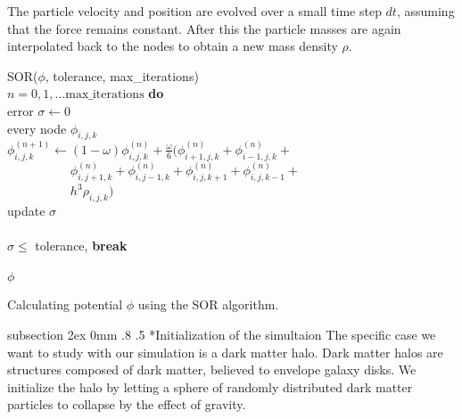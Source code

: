 \documentclass[notitlepage, 12pt]{article}
\makeatletter
\renewcommand{\subsection}{\@startsection    %
        {subsection}
        {2ex}
        {0mm}
        {.8\baselineskip}
        {.5\baselineskip}
        {\bfseries\normalsize}}
\makeatother
\begin{document}
The particle velocity and position are evolved over a small time step $dt$, assuming that the force remains constant. After this the particle masses are again interpolated back to the nodes to obtain a new mass density $\rho$.

\begin{algorithm}[H]
\hspace{0.1\textwidth}\parbox{.8\textwidth}{
\-\hspace{0ex}{\bf function} SOR($\phi$, tolerance, max\_iterations)\\
\-\hspace{4ex}{\bf for} $n = 0,1,\ldots\mbox{max\_iterations}$ {\bf do}\\
\-\hspace{8ex}error $\sigma\leftarrow 0$\\
\-\hspace{8ex}{\bf for} every node $\phi_{i,j,k}$\\
\-\hspace{12ex}$\phi_{i,j,k}^{(n+1)} \leftarrow (1-\omega)\phi_{i,j,k}^{(n)} + \frac{\omega}{6} (\phi_{i+1,j,k}^{(n)} +\phi_{i-1,j,k}^{(n)}+$\\
\-\hspace{12ex}$\phantom{\phi_{i,j,k}^{(n+1)} \leftarrow }\phi_{i,j+1,k}^{(n)}+ \phi_{i,j-1,k}^{(n)} + \phi_{i,j,k+1}^{(n)} + \phi_{i,j,k-1}^{(n)} +$\\
\-\hspace{12ex}$\phantom{\phi_{i,j,k}^{(n+1)} \leftarrow} h^3\rho_{i,j,k})$\\
\-\hspace{12ex}update $\sigma$\\
\-\hspace{8ex}{\bf end for}\\
\-\hspace{8ex}{\bf if} $\sigma \leq $ tolerance, {\bf break}\\
\-\hspace{4ex}{\bf end for}\\
\-\hspace{4ex}{\bf return} $\phi$\\
\-\hspace{0ex}{\bf end function}}
\caption{Calculating potential $\phi$ using the SOR algorithm.}
\label{alg:SOR}
\end{algorithm}

\subsection*{Initialization of the simultaion}
The specific case we want to study with our simulation is a dark matter halo. Dark matter halos are structures composed of dark matter, believed to envelope galaxy disks. We initialize the halo by letting a sphere of randomly distributed dark matter particles to collapse by the effect of gravity.
\end{document}
